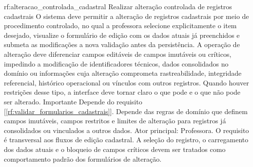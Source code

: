 \reqfuncfull
{rf:alteracao_controlada_cadastral}
{Realizar alteração controlada de registros cadastrais}
{O sistema deve permitir a alteração de registros cadastrais por meio de procedimento controlado, no qual a professora selecione explicitamente o item desejado, visualize o formulário de edição com os dados atuais já preenchidos e submeta as modificações a nova validação antes da persistência. A operação de alteração deve diferenciar campos editáveis de campos imutáveis ou críticos, impedindo a modificação de identificadores técnicos, dados consolidados no domínio ou informações cuja alteração comprometa rastreabilidade, integridade referencial, histórico operacional ou vínculos com outros registros. Quando houver restrições desse tipo, a interface deve tornar claro o que pode e o que não pode ser alterado.}
{Importante}
{Depende do requisito [\ref{rf:validar_formularios_cadastrais}]. Depende das regras de domínio que definem campos imutáveis, campos restritos e limites de alteração para registros já consolidados ou vinculados a outros dados.}
{Ator principal: Professora. O requisito é transversal aos fluxos de edição cadastral. A seleção do registro, o carregamento dos dados atuais e o bloqueio de campos críticos devem ser tratados como comportamento padrão dos formulários de alteração.}

